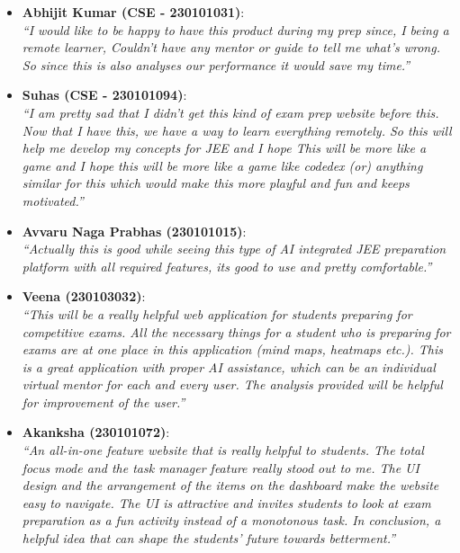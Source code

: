 \documentclass[a4paper, 11pt, oneside]{report}
\begin{document}
        \begin{itemize}
            \item \textbf{Abhijit Kumar (CSE - 230101031)}: \\
            \textit{``I would like to be happy to have this product during my prep since, I being a remote learner, Couldn’t have any mentor or guide to tell me what’s wrong. So since this is also analyses our performance it would save my time.''}

            \item \textbf{Suhas (CSE - 230101094)}: \\
            \textit{``I am pretty sad that I didn't get this kind of exam prep website before this. Now that I have this, we have a way to learn everything remotely. So this will help me develop my concepts for JEE and I hope This will be more like a game and I hope this will be more like a game like codedex (or) anything similar for this which would make this more playful and fun and keeps motivated.''}

            \item \textbf{Avvaru Naga Prabhas (230101015)}: \\
            \textit{``Actually this is good while seeing this type of AI integrated JEE preparation platform with all required features, its good to use and pretty comfortable.''}

            \item \textbf{Veena (230103032)}: \\
            \textit{``This will be a really helpful web application for students preparing for competitive exams. All the necessary things for a student who is preparing for exams are at one place in this application (mind maps, heatmaps etc.). This is a great application with proper AI assistance, which can be an individual virtual mentor for each and every user. The analysis provided will be helpful for improvement of the user.''}

            \item \textbf{Akanksha (230101072)}: \\
            \textit{``An all-in-one feature website that is really helpful to students. The total focus mode and the task manager feature really stood out to me. The UI design and the arrangement of the items on the dashboard make the website easy to navigate. The UI is attractive and invites students to look at exam preparation as a fun activity instead of a monotonous task. In conclusion, a helpful idea that can shape the students’ future towards betterment.''}
        \end{itemize}
        
        
	
        
	
	
	
	
\end{document}
